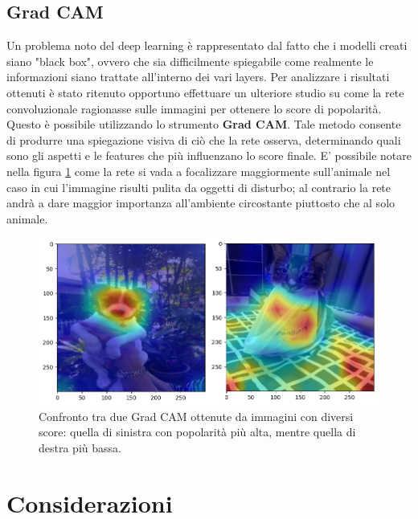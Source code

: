 \newpage


\subsection{Grad CAM}

Un problema noto del deep learning è rappresentato dal fatto che i modelli creati siano "black box", ovvero che sia difficilmente spiegabile come realmente le informazioni siano trattate all'interno dei vari layers. Per analizzare i risultati ottenuti è stato ritenuto opportuno effettuare un ulteriore studio su come la rete convoluzionale ragionasse sulle immagini per ottenere lo score di popolarità. Questo è possibile utilizzando lo strumento \textbf{Grad CAM\cite{2019}}. Tale metodo consente di produrre una spiegazione visiva di ciò che la rete osserva, determinando quali sono gli aspetti e le features che più influenzano lo score finale. E' possibile notare nella figura \ref{fig:grad-cam} come la rete si vada a focalizzare maggiormente sull'animale nel caso in cui l'immagine risulti pulita da oggetti di disturbo; al contrario la rete andrà a dare maggior importanza all'ambiente circostante piuttosto che al solo animale.

\vspace{1cm}

\begin{figure}[h]
        \centering
        \includegraphics[scale=0.6]{Plot/GRAD-CAM.png}
        \caption{Confronto tra due Grad CAM ottenute da immagini con diversi score: quella di sinistra con popolarità più alta, mentre quella di destra più bassa.}
        \label{fig:grad-cam}
\end{figure}
    

    
    
\newpage


\section{Considerazioni}

